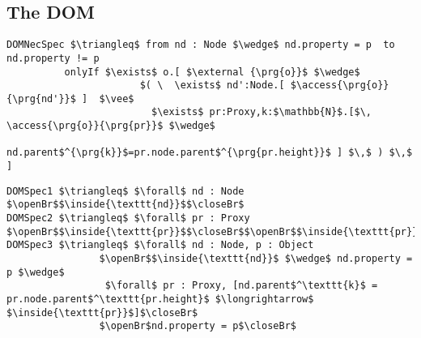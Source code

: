 \subsection{The DOM} %
\label{ss:DOM}
%
%
\begin{lstlisting}[language = Chainmail, mathescape=true,xleftmargin=2em,frame=lines,framexleftmargin=1.5em]
DOMNecSpec $\triangleq$ from nd : Node $\wedge$ nd.property = p  to nd.property != p
          onlyIf $\exists$ o.[ $\external {\prg{o}}$ $\wedge$ 
                       $( \  \exists$ nd':Node.[ $\access{\prg{o}}{\prg{nd'}}$ ]  $\vee$ 
                         $\exists$ pr:Proxy,k:$\mathbb{N}$.[$\, \access{\prg{o}}{\prg{pr}}$ $\wedge$ 
                         nd.parent$^{\prg{k}}$=pr.node.parent$^{\prg{pr.height}}$ ] $\,$ ) $\,$ ]
\end{lstlisting}
\begin{lstlisting}[language = Chainmail, mathescape=true,xleftmargin=2em,frame=lines,framexleftmargin=1.5em]
DOMSpec1 $\triangleq$ $\forall$ nd : Node $\openBr$$\inside{\texttt{nd}}$$\closeBr$
DOMSpec2 $\triangleq$ $\forall$ pr : Proxy $\openBr$$\inside{\texttt{pr}}$$\closeBr$$\openBr$$\inside{\texttt{pr}}$$\closeBr$
DOMSpec3 $\triangleq$ $\forall$ nd : Node, p : Object
				$\openBr$$\inside{\texttt{nd}}$ $\wedge$ nd.property = p $\wedge$ 
				 $\forall$ pr : Proxy, [nd.parent$^\texttt{k}$ =  pr.node.parent$^\texttt{pr.height}$ $\longrightarrow$ $\inside{\texttt{pr}}$]$\closeBr$
				$\openBr$nd.property = p$\closeBr$
\end{lstlisting}

